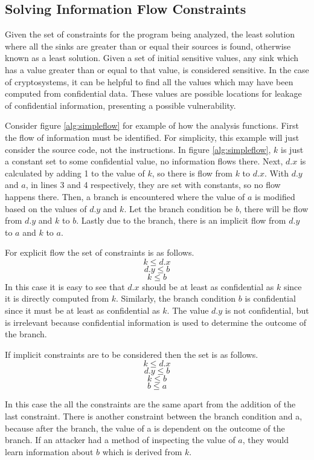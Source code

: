 \subsection{Solving Information Flow Constraints}
Given the set of constraints for the program being analyzed, the least solution
where all the sinks are greater than or equal their sources is found, otherwise
known as a least solution. Given a set of initial sensitive values, any sink
which has a value greater than or equal to that value, is considered sensitive.
In the case of cryptosystems, it can be helpful to find all the values which
may have been computed from confidential data. These values are possible
locations for leakage of confidential information, presenting a possible
vulnerability.


Consider figure \ref{alg:simpleflow} for example of how the analysis functions.
First the flow of information must be identified. For simplicity, this example
will just consider the source code, not the instructions. In figure
\ref{alg:simpleflow}, $k$ is just a constant set to some confidential value, no
information flows there. Next, $d.x$ is calculated by adding 1 to the value of
$k$, so there is flow from $k$ to $d.x$. With $d.y$ and $a$, in lines 3 and 4
respectively, they are set with constants, so no flow happens there. Then, a
branch is encountered where the value of $a$ is modified based on the values of
$d.y$ and $k$. Let the branch condition be $b$, there will be flow from $d.y$
and $k$ to $b$. Lastly due to the branch, there is an implicit flow from $d.y$
to $a$ and $k$ to $a$.

For explicit flow the set of constraints is as follows.
\[
  k \leq d.x
\]
\[
  d.y \leq b
\]
\[
  k \leq b
\]
In this case it is easy to see that $d.x$ should be at least as confidential as $k$
since it is directly computed from $k$. Similarly, the branch condition $b$ is
confidential since it must be at least as confidential as $k$. The value $d.y$
is not confidential, but is irrelevant because confidential information is used
to determine the outcome of the branch.

If implicit constraints are to be considered then the set is as follows.
\[
  k \leq d.x
\]
\[
  d.y \leq b
\]
\[
  k \leq b
\]
\[
  b \leq a
\]

In this case the all the constraints are the same apart from the addition of the
last constraint. There is another constraint between the branch condition and a,
because after the branch, the value of a is dependent on the outcome of the
branch. If an attacker had a method of inspecting the value of $a$, they would
learn information about $b$ which is derived from $k$.

